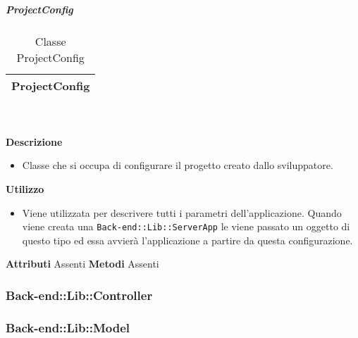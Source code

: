			\subparagraph{ProjectConfig} 
\begin{table}[ht]
\begin{center}
\bgroup
	\setlength{\arrayrulewidth}{0.6mm}
	\def\arraystretch{1}
		\begin{tabular}{ | p{12cm} | }
				\hline  
					\centerline{\textbf{ProjectConfig}}
		\\ \hline 
				\hline
				\hline
		
		\end{tabular}
\egroup
\caption{Classe ProjectConfig}
\end{center}
\end{table} \textbf{\\ \\ Descrizione}
\begin{itemize}
\item[] Classe che si occupa di configurare il progetto creato dallo sviluppatore.
\end{itemize} 
\textbf{Utilizzo}
\begin{itemize}
\item[] Viene utilizzata per descrivere tutti i parametri dell'applicazione. Quando viene creata una \texttt{Back-end::Lib::ServerApp} le viene passato un oggetto di questo tipo ed essa avvierà l'applicazione a partire da questa configurazione.
\end{itemize}
\textbf{Attributi}
Assenti
\textbf{Metodi}
Assenti

	\subsubsection{Back-end::Lib::Controller} 
	\subsubsection{Back-end::Lib::Model} 
